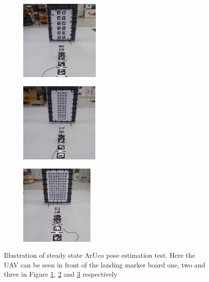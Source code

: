 \documentclass[../Head/report.tex]{subfiles}
\begin{document}
\begin{figure}[H]
    \centering
    \begin{subfigure}[t]{.25\textwidth}
        \centering
        \includegraphics[height=4.0cm]{../Figures/optitrack/steady_state_pose_estimation_one.png}
        \caption{}
        \label{fig:steady_state_aruco_pose_estimation_board_one}
    \end{subfigure}
    \begin{subfigure}[t]{.25\textwidth}
        \centering
        \includegraphics[height=4.0cm]{../Figures/optitrack/steady_state_pose_estimation_two.png}
        \caption{}
        \label{fig:steady_state_aruco_pose_estimation_board_two}
    \end{subfigure}
    \begin{subfigure}[t]{.25\textwidth}
        \centering
        \includegraphics[height=4.0cm]{../Figures/optitrack/steady_state_pose_estimation_three.png}
        \caption{}
        \label{fig:steady_state_aruco_pose_estimation_board_three}
    \end{subfigure}
    \caption{Illustration of steady state ArUco pose estimation test. Here the UAV can be seen in front of the landing marker board one, two and three in Figure \ref{fig:steady_state_aruco_pose_estimation_board_one}, \ref{fig:steady_state_aruco_pose_estimation_board_two} and \ref{fig:steady_state_aruco_pose_estimation_board_three} respectively} 
    \label{fig:steady_state_aruco_pose_estimation_boards}
\end{figure}
\end{document}
